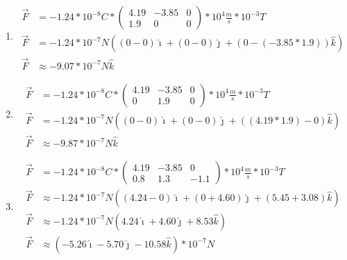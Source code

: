 \documentclass[10pt, twoside]{article}
\begin{document}
\begin{enumerate}[label=\alph*.]
	\item
		\begin{align*}
			\vec{F} &= -1.24*10^{-8}C*
			\begin{pmatrix}
				4.19 & -3.85 & 0 \\
				1.9 & 0 & 0
			\end{pmatrix}
			*10^4 \frac{m}{s} *10^{-3}T\\
			\vec{F} &= -1.24*10^{-7}N
			(
				(0-0)\hat{\imath}
				+(0-0)\hat{\jmath}
				+(0-(-3.85*1.9))\hat{k}
			)\\
			\vec{F} &\approx -9.07*10^{-7}N\hat{k}
		\end{align*}
	\item
		\begin{align*}
			\vec{F} &= -1.24*10^{-8}C*
			\begin{pmatrix}
				4.19 & -3.85 & 0 \\
				0 & 1.9 & 0
			\end{pmatrix}
			*10^4 \frac{m}{s} *10^{-3}T\\
			\vec{F} &= -1.24*10^{-7}N
			(
				(0-0)\hat{\imath}
				+(0-0)\hat{\jmath}
				+((4.19*1.9)-0)\hat{k}
			)\\
			\vec{F} &\approx -9.87*10^{-7}N\hat{k}
		\end{align*}
	\item
		\begin{align*}
				\vec{F} &= -1.24*10^{-8}C*
			\begin{pmatrix}
				4.19 & -3.85 & 0 \\
				0.8 & 1.3 & -1.1
			\end{pmatrix}
			*10^4 \frac{m}{s} *10^{-3}T\\
			\vec{F} &\approx -1.24*10^{-7}N
			(
				(4.24-0)\hat{\imath}
				+(0+4.60)\hat{\jmath}
				+(5.45+3.08)\hat{k}
			)\\
			\vec{F} &\approx -1.24*10^{-7}N
			(
				4.24\hat{\imath}
				+4.60\hat{\jmath}
				+8.53\hat{k}
			)\\
			\vec{F} &\approx
			(
				-5.26\hat{\imath}
				-5.70\hat{\jmath}
				-10.58\hat{k}
			)
			*10^{-7}N
		\end{align*}
\end{enumerate}
\end{document}
